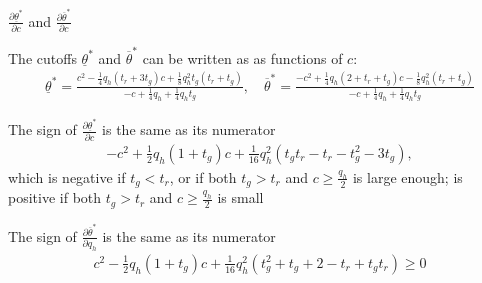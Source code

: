 \documentclass[9pt,aspectratio=1610]{beamer}
\begin{document}
\begin{frame}{$\frac{\partial\underline{\theta}^*}{\partial c}$ and $\frac{\partial\overline{\theta}^*}{\partial c}$}\label{partial_c}

The cutoffs $\underline{\theta}^*$ and $\overline{\theta}^*$ can be written as as functions of $c$:
\begin{align*}
    \underline{\theta}^* = \frac{c^2 - \frac{1}{4}q_h(t_r+3t_g)c +\frac{1}{8}q_h^2t_g(t_r+t_g)}{-c+\frac{1}{4}q_h+\frac{1}{4}q_ht_g},\quad \overline{\theta}^* = \frac{-c^2 + \frac{1}{4}q_h(2+t_r+t_g)c  - \frac{1}{8}q_h^2(t_r+t_g)}{-c+\frac{1}{4}q_h+\frac{1}{4}q_ht_g}
\end{align*}

The sign of $\frac{\partial \underline{\theta}^*}{\partial c}$ is the same as its numerator
\begin{align*}
     -c^2 + \frac{1}{2}q_h(1+t_g)c + \frac{1}{16}q_h^2(t_gt_r-t_r-t_g^2-3t_g),
\end{align*}
which is negative if $t_g<t_r$, or if both $t_g>t_r$ and $c\geq \frac{q_h}{2}$ is large enough; is positive if both $t_g>t_r$ and $c\geq \frac{q_h}{2}$ is small 
\vspace{1em}

The sign of $\frac{\partial \overline{\theta}^*}{\partial q_h}$ is the same as its numerator
\begin{align*}
    c^2-\frac{1}{2}q_h(1+t_g)c + \frac{1}{16}q_h^2(t_g^2+t_g+2-t_r+t_gt_r)\geq 0
\end{align*}


\vspace{1em}
\hyperlink{proof_partial_c}{}
\vspace{1em}
\end{frame}
\end{document}
